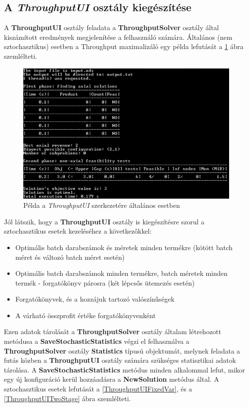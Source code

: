 \subsection{A \textit{ThroughputUI} osztály kiegészítése}
A \textbf{ThroughputUI} osztály feladata a \textbf{ThroughputSolver} osztály által kiszámított eredmények megjelenítése a felhasználó számára. Általános (nem sztochasztikus) esetben a Throughput maximalizáló egy példa lefutását a \ref{ThroughputUI} ábra szemlélteti.
\begin{figure}[H]
\begin{center}
\includegraphics[scale=0.8]{throughputUI}
\caption{Példa a \textit{ThroughputUI} szerkezetére általános esetben}
\label{ThroughputUI}
\end{center}
\end{figure}
Jól látszik, hogy a \textbf{ThroughputUI} osztály is kiegészítésre szorul a sztochasztikus esetek kezeléséhez a következőkkel:
\begin{itemize}
\item Optimális batch darabszámok és méretek minden termékre (kötött batch méret és változó batch méret esetén)
\item Optimális batch darabszámok minden termékre, batch méretek minden termék - forgatókönyv párosra (két lépcsős ütemezés esetén)
\item Forgatókönyvek, és a hozzájuk tartozó valószínűségek
\item A várható összprofit értéke forgatókönyvenként
\end{itemize}
Ezen adatok tárolását a \textbf{ThroughputSolver} osztály általam létrehozott metódusa a \textbf{SaveStochasticStatistics} végzi el felhasználva a \textbf{ThroughputSolver} osztály \textbf{Statistics} típusú objektumát, melynek feladata a futás közben a \textbf{ThroughputUI} osztály számára szükséges statisztikai adatok tárolása. A \textbf{SaveStochasticStatistics} metódus minden alkalommal lefut, mikor egy új konfiguráció kerül hozzáadásra a \textbf{NewSolution} metódus által. A sztochasztikus esetek lefutását a \ref{ThroughputUIFixedVar}, és a \ref{ThroughputUITwoStage} ábra szemlélteti.
